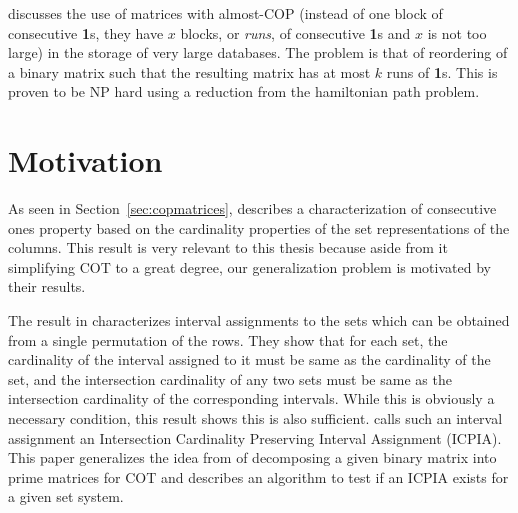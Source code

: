 \documentclass[MS,synopsis]{iitmdiss}
\def \un {\bf 1}
\begin{document}
\cite{jkckv04} discusses the use of matrices with almost-COP (instead
of one block of consecutive {\un}s, they have $x$ blocks, or {\em
  runs}, of consecutive {\un}s and $x$ is not too large) in the
storage of very large databases.  The problem is that of reordering of
a binary matrix such that the resulting matrix has at most $k$ runs of
{\un}s. This is proven to be NP hard using a reduction from the
hamiltonian path problem.
  


\section{Motivation}
\label{sec:motive}
As seen in Section~\ref{sec:copmatrices}, \cite{nsnrs09} describes a
characterization of consecutive ones property based on the cardinality
properties of the set representations of the columns. This result is
very relevant to this thesis because aside from it simplifying COT to
a great degree, our generalization problem is motivated by their
results.

The result in
\cite{nsnrs09} characterizes interval assignments to the sets which
can be obtained from a single permutation of the rows.  They show that
for each set, the cardinality of the interval assigned to it must be
same as the cardinality of the set, and the intersection cardinality
of any two sets must be same as the intersection cardinality of the
corresponding intervals.  While this is obviously a necessary
condition, this result shows this is also sufficient.  \cite{nsnrs09}
calls such an interval assignment an Intersection Cardinality
Preserving Interval Assignment (ICPIA).  This paper generalizes the
idea from \cite{wlh02} of decomposing a given binary matrix into prime
matrices for COT and describes an algorithm to test if an ICPIA exists
for a given set system.
\end{document}
